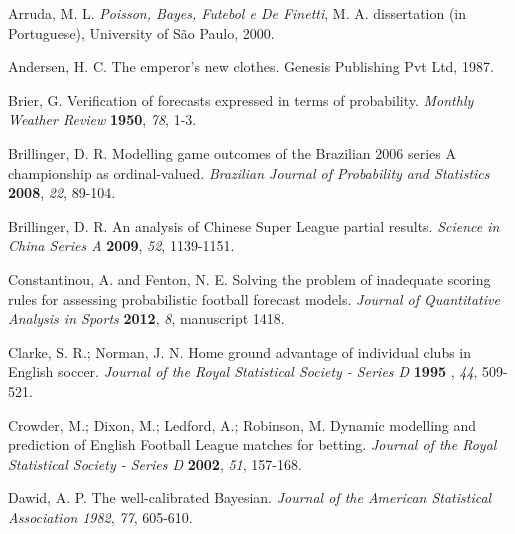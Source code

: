 \documentclass[journal,article,accept,moreauthors,pdftex,12pt,a4paper]{mdpi}
\begin{document}
		\begin{thebibliography}{999} %
			
			
			
			
			Arruda, M. L. {\em Poisson, Bayes, Futebol e De Finetti}, M. A. dissertation (in Portuguese), University of S\~ao Paulo, 2000.
			
			Andersen, H.  C. The emperor's new clothes. Genesis Publishing Pvt Ltd, 1987.
			
			Brier, G. Verification of forecasts expressed in terms of probability. {\em Monthly Weather Review} {\bf 1950}, {\em 78}, 1-3.
			
			Brillinger, D. R. Modelling game outcomes of the Brazilian 2006
			series A championship as ordinal-valued. {\em Brazilian Journal of Probability and Statistics} {\bf 2008}, {\em 22}, 89-104.
			
			Brillinger, D. R. An analysis of Chinese Super League partial
			results. {\em Science in China Series A} {\bf 2009}, {\em 52},
			1139-1151.
			
			Constantinou, A. and Fenton, N. E. Solving the problem of inadequate scoring rules for assessing probabilistic football forecast models. {\em Journal of Quantitative Analysis in Sports} {\bf 2012}, {\em 8}, manuscript 1418.
			
			Clarke, S. R.; Norman, J. N. Home ground advantage of individual clubs in English soccer. {\em Journal of the Royal Statistical Society - Series D} {\bf 1995} ,
			{\em 44}, 509-521.
			
			 Crowder, M.; Dixon, M.; Ledford, A.; Robinson, M. Dynamic modelling and prediction of English
			Football League matches for betting. {\em Journal of the Royal
				Statistical Society - Series D} {\bf 2002}, {\em 51}, 157-168.
			
			 Dawid, A. P. The well-calibrated Bayesian.
			{\em Journal of the American Statistical Association} {\em 1982}, {\em 77}, 605-610.
			

\end{thebibliography}
\end{document}
